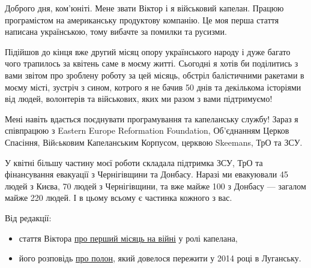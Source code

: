  
 
 
 
 

Доброго дня, ком'юніті. Мене звати Віктор і я військовий капелан. Працюю
програмістом на американську продуктову компанію. Це моя перша стаття написана
українською, тому вибачте за помилки та русизми.

Підійшов до кінця вже другий місяц опору українського народу і дуже багато чого
трапилось за квітень саме в моєму житті. Сьогодні я хотів би поділитись з вами
звітом про зроблену роботу за цей місяць, обстріл балістичними ракетами в моєму
місті, зустріч з сином, котрого я не бачив 50 днів та декількома історіями від
людей, волонтерів та військових, яких ми разом з вами підтримуємо!

Мені навіть вдається поєднувати програмування та капеланську службу! Зараз я
співпрацюю з Eastern Europe Reformation Foundation, Об'єднанням Церков
Спасіння, Війcьковим Капеланським Корпусом, церквою Skeemans, ТрО та ЗСУ.

У квітні більшу частину моєї роботи складала підтримка ЗСУ, ТрО та фінансування
евакуації з Чернігівщини та Донбасу. Наразі ми евакуювали 45 людей з Києва, 70
людей з Чернігівщини, та вже майже 100 з Донбасу — загалом майже 220 людей. І в
цьому всьому є частинка кожного з вас.

Від редакції:

\begin{itemize} %
\item стаття Віктора \href{https://dou.ua/forums/topic/37433/}{про перший місяць на війні} у ролі капелана, 
\item його розповідь \href{https://dou.ua/forums/topic/34022/}{про полон}, який довелося пережити у 2014 році в Луганську.
\end{itemize} %

